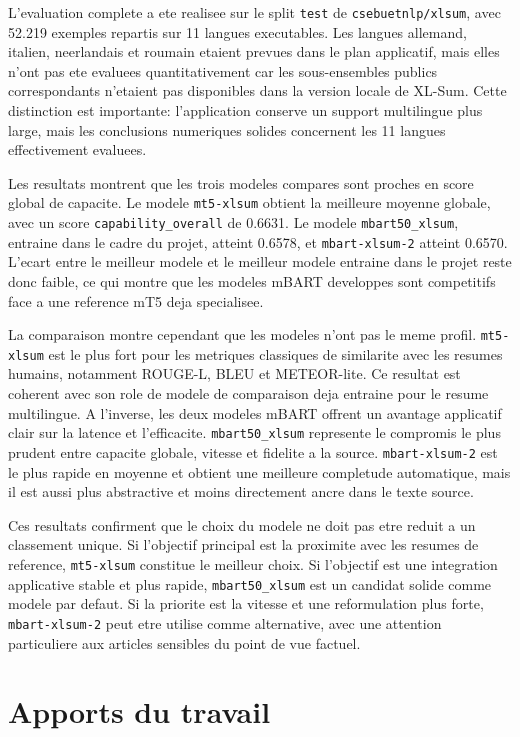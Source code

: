 L'evaluation complete a ete realisee sur le split \texttt{test} de \texttt{csebuetnlp/xlsum}, avec 52.219 exemples repartis sur 11 langues executables. Les langues allemand, italien, neerlandais et roumain etaient prevues dans le plan applicatif, mais elles n'ont pas ete evaluees quantitativement car les sous-ensembles publics correspondants n'etaient pas disponibles dans la version locale de XL-Sum. Cette distinction est importante: l'application conserve un support multilingue plus large, mais les conclusions numeriques solides concernent les 11 langues effectivement evaluees.

Les resultats montrent que les trois modeles compares sont proches en score global de capacite. Le modele \texttt{mt5-xlsum} obtient la meilleure moyenne globale, avec un score \texttt{capability\_overall} de 0.6631. Le modele \texttt{mbart50\_xlsum}, entraine dans le cadre du projet, atteint 0.6578, et \texttt{mbart-xlsum-2} atteint 0.6570. L'ecart entre le meilleur modele et le meilleur modele entraine dans le projet reste donc faible, ce qui montre que les modeles mBART developpes sont competitifs face a une reference mT5 deja specialisee.

La comparaison montre cependant que les modeles n'ont pas le meme profil. \texttt{mt5-xlsum} est le plus fort pour les metriques classiques de similarite avec les resumes humains, notamment ROUGE-L, BLEU et METEOR-lite. Ce resultat est coherent avec son role de modele de comparaison deja entraine pour le resume multilingue. A l'inverse, les deux modeles mBART offrent un avantage applicatif clair sur la latence et l'efficacite. \texttt{mbart50\_xlsum} represente le compromis le plus prudent entre capacite globale, vitesse et fidelite a la source. \texttt{mbart-xlsum-2} est le plus rapide en moyenne et obtient une meilleure completude automatique, mais il est aussi plus abstractive et moins directement ancre dans le texte source.

Ces resultats confirment que le choix du modele ne doit pas etre reduit a un classement unique. Si l'objectif principal est la proximite avec les resumes de reference, \texttt{mt5-xlsum} constitue le meilleur choix. Si l'objectif est une integration applicative stable et plus rapide, \texttt{mbart50\_xlsum} est un candidat solide comme modele par defaut. Si la priorite est la vitesse et une reformulation plus forte, \texttt{mbart-xlsum-2} peut etre utilise comme alternative, avec une attention particuliere aux articles sensibles du point de vue factuel.

\section{Apports du travail}

